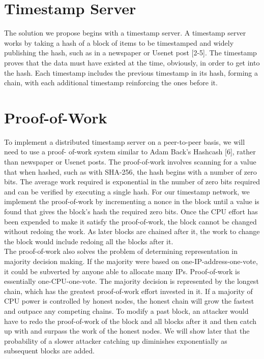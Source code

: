 \documentclass{article}
\begin{document}
\section{Timestamp Server}\label{sec:timestamp-server}
The solution we propose begins with a timestamp server.
A timestamp server works by taking a
hash of a block of items to be timestamped and widely publishing the hash, such as in a
newspaper or Usenet post [2-5].
The timestamp proves that the data must have existed at the
time, obviously, in order to get into the hash.
Each timestamp includes the previous timestamp in
its hash, forming a chain, with each additional timestamp reinforcing the ones before it. \\



\section{Proof-of-Work}\label{sec:proof-of-work}
To implement a distributed timestamp server on a peer-to-peer basis, we will need to use a proof-
of-work system similar to Adam Back's Hashcash [6], rather than newspaper or Usenet posts.
The proof-of-work involves scanning for a value that when hashed, such as with SHA-256, the
hash begins with a number of zero bits.
The average work required is exponential in the number
of zero bits required and can be verified by executing a single hash.
For our timestamp network, we implement the proof-of-work by incrementing a nonce in the
block until a value is found that gives the block's hash the required zero bits.
Once the CPU
effort has been expended to make it satisfy the proof-of-work, the block cannot be changed
without redoing the work.
As later blocks are chained after it, the work to change the block
would include redoing all the blocks after it. \\



The proof-of-work also solves the problem of determining representation in majority decision making.
If the majority were based on one-IP-address-one-vote, it could be subverted by anyone
able to allocate many IPs. Proof-of-work is essentially one-CPU-one-vote.
The majority
decision is represented by the longest chain, which has the greatest proof-of-work effort invested
in it.
If a majority of CPU power is controlled by honest nodes, the honest chain will grow the
fastest and outpace any competing chains.
To modify a past block, an attacker would have to
redo the proof-of-work of the block and all blocks after it and then catch up with and surpass the
work of the honest nodes.
We will show later that the probability of a slower attacker catching up
diminishes exponentially as subsequent blocks are added.
\end{document}

